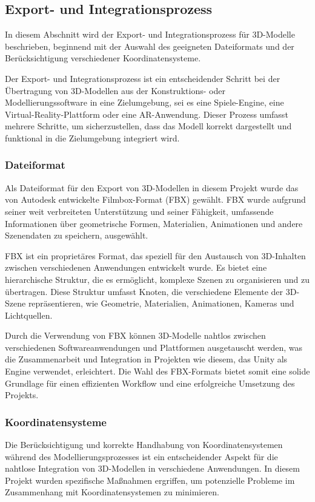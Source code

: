 \subsection{Export- und Integrationsprozess}
In diesem Abschnitt wird der Export- und Integrationsprozess für 3D-Modelle beschrieben, beginnend mit der Auswahl des
geeigneten Dateiformats und der Berücksichtigung verschiedener Koordinatensysteme.

Der Export- und Integrationsprozess ist ein entscheidender Schritt bei der Übertragung von 3D-Modellen aus der Konstruktions-
oder Modellierungssoftware in eine Zielumgebung, sei es eine Spiele-Engine, eine Virtual-Reality-Plattform oder eine AR-Anwendung.
Dieser Prozess umfasst mehrere Schritte, um sicherzustellen, dass das Modell korrekt dargestellt und funktional in die
Zielumgebung integriert wird.

\subsubsection{Dateiformat}
Als Dateiformat für den Export von 3D-Modellen in diesem Projekt wurde das von Autodesk entwickelte Filmbox-Format (FBX)
gewählt. FBX wurde aufgrund seiner weit verbreiteten Unterstützung und seiner Fähigkeit, umfassende Informationen über
geometrische Formen, Materialien, Animationen und andere Szenendaten zu speichern, ausgewählt.

FBX ist ein proprietäres Format, das speziell für den Austausch von 3D-Inhalten zwischen verschiedenen Anwendungen
entwickelt wurde. Es bietet eine hierarchische Struktur, die es ermöglicht, komplexe Szenen zu organisieren und zu
übertragen. Diese Struktur umfasst Knoten, die verschiedene Elemente der 3D-Szene repräsentieren, wie Geometrie,
Materialien, Animationen, Kameras und Lichtquellen.

Durch die Verwendung von FBX können 3D-Modelle nahtlos zwischen verschiedenen Softwareanwendungen und Plattformen
ausgetauscht werden, was die Zusammenarbeit und Integration in Projekten wie diesem, das Unity als Engine verwendet,
erleichtert. Die Wahl des FBX-Formats bietet somit eine solide Grundlage für einen effizienten Workflow und eine
erfolgreiche Umsetzung des Projekts.

\subsubsection{Koordinatensysteme}
Die Berücksichtigung und korrekte Handhabung von Koordinatensystemen während des Modellierungsprozesses ist ein
entscheidender Aspekt für die nahtlose Integration von 3D-Modellen in verschiedene Anwendungen. In diesem Projekt
wurden spezifische Maßnahmen ergriffen, um potenzielle Probleme im Zusammenhang mit Koordinatensystemen zu minimieren.

